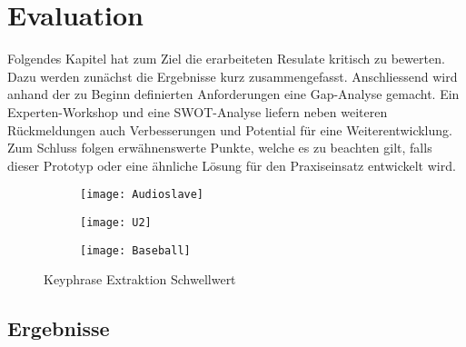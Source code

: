 \chapter{Evaluation}

Folgendes Kapitel hat zum Ziel die erarbeiteten Resulate kritisch zu bewerten. Dazu werden zunächst die Ergebnisse kurz zusammengefasst. Anschliessend wird anhand der zu Beginn definierten Anforderungen eine Gap-Analyse gemacht. Ein Experten-Workshop und eine SWOT-Analyse liefern neben weiteren Rückmeldungen auch Verbesserungen und Potential für eine Weiterentwicklung. Zum Schluss folgen erwähnenswerte Punkte, welche es zu beachten gilt, falls dieser Prototyp oder eine ähnliche Lösung für den Praxiseinsatz entwickelt wird.


\begin{figure}[htbp]
    \centering
    \begin{subfigure}[b]{0.8\textwidth}
    \texttt{[image: Audioslave]}
    \end{subfigure}
     \begin{subfigure}[b]{0.8\textwidth}
    \texttt{[image: U2]}
    \end{subfigure}
     \begin{subfigure}[b]{0.8\textwidth}
    \texttt{[image: Baseball]}
    \end{subfigure}
    \caption{Keyphrase Extraktion Schwellwert}
    \label{examples-keyphrase}
\end{figure}


\section{Ergebnisse}

